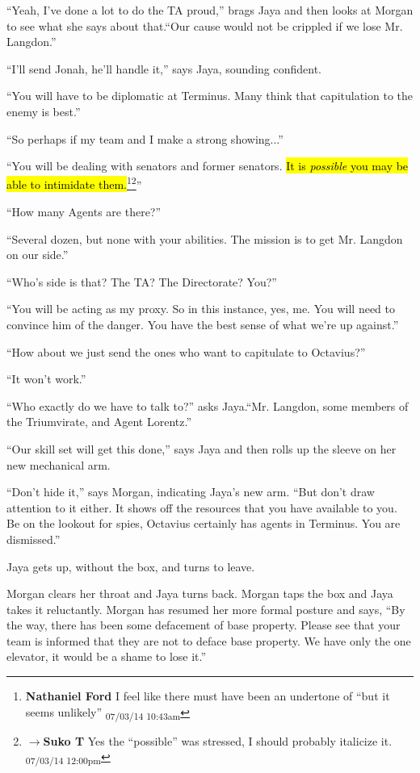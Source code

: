 ``Yeah, I've done a lot to do the TA proud,'' brags Jaya and then looks at Morgan to see what she says about that.``Our cause would not be crippled if we lose Mr. Langdon.''

``I'll send Jonah, he'll handle it,'' says Jaya, sounding confident.

``You will have to be diplomatic at Terminus.  Many think that capitulation to the enemy is best.''

``So perhaps if my team and I make a strong showing...''

``You will be dealing with senators and former senators.  \hl{It is \textit{possible }you may be able to intimidate them.}\footnote{\textbf{Nathaniel Ford }I feel like there must have been an undertone of ``but it seems unlikely'' \textsubscript{07/03/14 10:43am}}\footnote{$\rightarrow$\textbf{Suko T }Yes the ``possible'' was stressed, I should probably italicize it. \textsubscript{07/03/14 12:00pm}}''

``How many Agents are there?''

``Several dozen, but none with your abilities.  The mission is to get Mr. Langdon on our side.''

``Who's side is that?  The TA?  The Directorate?  You?''

``You will be acting as my proxy.  So in this instance, yes, me.  You will need to convince him of the danger.  You have the best sense of what we're up against.''

``How about we just send the ones who want to capitulate to Octavius?''

``It won't work.''

``Who exactly do we have to talk to?'' asks Jaya.``Mr. Langdon, some members of the Triumvirate, and Agent Lorentz.''

``Our skill set will get this done,'' says Jaya and then rolls up the sleeve on her new mechanical arm.

``Don't hide it,'' says Morgan, indicating Jaya's new arm. ``But don't draw attention to it either.  It shows off the resources that you have available to you.  Be on the lookout for spies, Octavius certainly has agents in Terminus.  You are dismissed.''

Jaya gets up, without the box, and turns to leave.

Morgan clears her throat and Jaya turns back.  Morgan taps the box and Jaya takes it reluctantly.  Morgan has resumed her more formal posture and says, ``By the way, there has been some defacement of base property.  Please see that your team is informed that they are not to deface base property.  We have only the one elevator, it would be a shame to lose it.''

